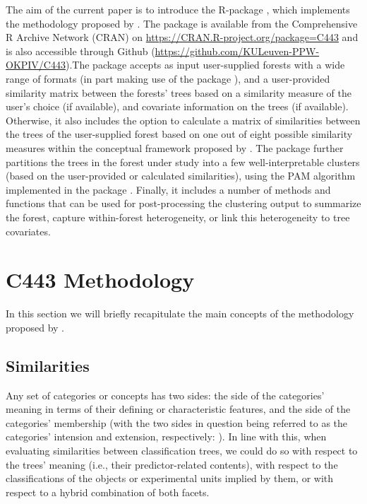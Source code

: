 The aim of the current paper is to introduce the R-package , which implements the methodology proposed by \citet{Sies2020}. The package is available from the Comprehensive R Archive Network (CRAN) on \url{https://CRAN.R-project.org/package=C443} and is also accessible through Github (\url{https://github.com/KULeuven-PPW-OKPIV/C443}).The package accepts as input user-supplied forests with a wide range of formats (in part making use of the  package \citep{Hothornb2015}), and a user-provided similarity matrix between the forests' trees based on a similarity measure of the user's choice (if available), and covariate information on the trees (if available). Otherwise, it  also includes the option to calculate a matrix of similarities between the trees of the user-supplied forest based on one out of eight possible similarity measures within the conceptual framework proposed by \citet{Sies2020}. The package further partitions the trees in the forest under study into a few well-interpretable clusters (based on the user-provided or calculated similarities), using the PAM algorithm \citep{Kaufman2009} implemented in the  package \citep{Maechler2019}. Finally, it includes a number of methods and functions that can be used for post-processing the clustering output to summarize the forest, capture within-forest heterogeneity, or link this heterogeneity to tree covariates.


\section{C443 Methodology} \label{sec:methodology}
In this section we will briefly recapitulate the main concepts of the methodology proposed by \citet{Sies2020}.

\subsection{Similarities}
Any set of categories or concepts has two sides: the side of the categories' meaning in terms of their defining or characteristic features, and the side of the categories' membership (with the two sides in question being referred to as the categories' intension and extension, respectively: \citet{leibniz1764}). In line with this, when evaluating similarities between classification trees, we could do so with respect to the trees' meaning (i.e., their predictor-related contents), with respect to the classifications of the objects or experimental units implied by them, or with respect to a hybrid combination of both facets.

